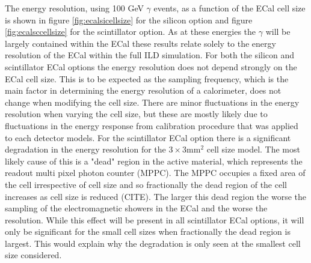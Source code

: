 The energy resolution, using 100 GeV $\gamma$ events, as a function of the ECal cell size is shown in figure \ref{fig:ecalsicellsize} for the silicon option and figure \ref{fig:ecalsccellsize} for the scintillator option.  As at these energies the $\gamma$ will be largely contained within the ECal these results relate solely to the energy resolution of the ECal within the full ILD simulation.  For both the silicon and scintillator ECal options the energy resolution does not depend strongly on the ECal cell size.  This is to be expected as the sampling frequency, which is the main factor in determining the energy resolution of a calorimeter, does not change when modifying the cell size.  There are minor fluctuations in the energy resolution when varying the cell size, but these are mostly likely due to fluctuations in the energy response from calibration procedure that was applied to each detector models.  For the scintillator ECal option there is a significant degradation in the energy resolution for the $3 \times 3 \text{mm}^{2}$ cell size model.  The most likely cause of this is a "dead" region in the active material, which represents the readout multi pixel photon counter (MPPC).  The MPPC occupies a fixed area of the cell irrespective of cell size and so fractionally the dead region of the cell increases as cell size is reduced (CITE).  The larger this dead region the worse the sampling of the electromagnetic showers in the ECal and the worse the resolution.  While this effect will be present in all scintillator ECal options, it will only be significant for the small cell sizes when fractionally the dead region is largest.  This would explain why the degradation is only seen at the smallest cell size considered.     

